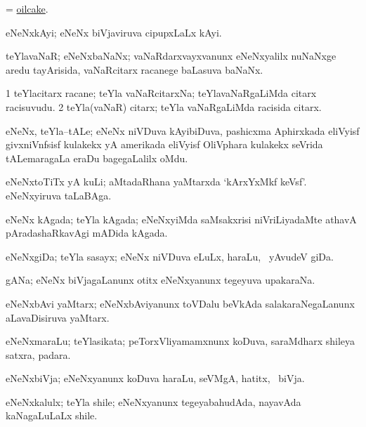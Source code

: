 \bentry
{}
\gl{\nA}
\bmng
= \hyperlink{oilcake}{oilcake}. 
\emng
\eentry

\bentry
{}
\gl{\nA}
\bmng
eNeNxkAyi; eNeNx biVjaviruva cipupxLaLx kAyi. 
\emng
\eentry

\bentry
{}
\gl{\nA}
\bmng
teYlavaNaR; eNeNxbaNaNx; vaNaRdarxvayxvanunx eNeNxyalilx nuNaNxge aredu tayArisida, vaNaRcitarx racanege baLasuva baNaNx. 
\emng
\eentry

\bentry
{}
\gl{\nA}
\bmng
\bnum
\num{1} teYlacitarx racane; teYla vaNaRcitarxNa; teYlavaNaRgaLiMda citarx racisuvudu. 
\num{2} teYla(vaNaR) citarx; teYla vaNaRgaLiMda racisida citarx. 
\enum
\emng
\eentry

\bentry
{}
\gl{\nA}
\bmng
eNeNx, teYla--tALe; eNeNx niVDuva kAyibiDuva, pashicxma Aphirxkada eliVyisf givxniVnfsisf kulakekx yA amerikada eliVyisf OliVphara kulakekx seVrida tALemaragaLa eraDu bagegaLalilx oMdu. 
\emng
\eentry

\bentry
{}
\gl{\nA}
\bmng
eNeNxtoTiTx yA kuLi; aMtadaRhana yaMtarxda `kArxYxMkf keVsf'. eNeNxyiruva taLaBAga. 
\emng
\eentry

\bentry
{}
\gl{\nA}
\bmng
eNeNx kAgada; teYla kAgada; eNeNxyiMda saMsakxrisi niVriLiyadaMte athavA pAradashaRkavAgi mADida kAgada. 
\emng
\eentry

\bentry
{}
\gl{\nA}
\bmng
eNeNxgiDa; teYla sasayx; eNeNx niVDuva eLuLx, haraLu, \mo\ yAvudeV giDa. 
\emng
\eentry

\bentry
{}
\gl{\nA}
\bmng
gANa; eNeNx biVjagaLanunx otitx eNeNxyanunx tegeyuva upakaraNa. 
\emng
\eentry

\bentry
{}
\gl{\nA}
\bmng
eNeNxbAvi yaMtarx; eNeNxbAviyanunx toVDalu beVkAda salakaraNegaLanunx aLavaDisiruva yaMtarx. 
\emng
\eentry

\bentry
{}
\gl{\nA}
\bmng
eNeNxmaraLu; teYlasikata; peTorxVliyamamxnunx koDuva, saraMdharx shileya satxra, padara. 
\emng
\eentry

\bentry
{}
\gl{\nA}
\bmng
eNeNxbiVja; eNeNxyanunx koDuva haraLu, seVMgA, hatitx, \mo\ biVja. 
\emng
\eentry

\bentry
{}
\gl{\nA}
\bmng
eNeNxkalulx; teYla shile; eNeNxyanunx tegeyabahudAda, nayavAda kaNagaLuLaLx shile. 
\emng
\eentry


